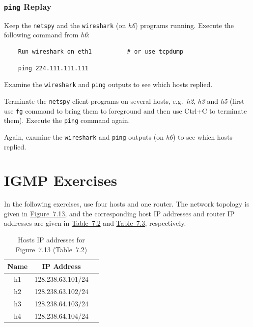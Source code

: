 \documentclass{UTNetLab}
\begin{document}
\section{\texttt{ping} Replay}
    Keep the \lstinline{netspy} and the \lstinline{wireshark} (on \textit{h6}) programs running.
    Execute the following command from \textit{h6}:

    \begin{lstlisting}
    Run wireshark on eth1          # or use tcpdump
    \end{lstlisting}

    \begin{lstlisting}
	ping 224.111.111.111
    \end{lstlisting}
    Examine the \lstinline{wireshark} and \lstinline{ping} outputs to see which hosts replied.

    Terminate the \lstinline{netspy} client programs on several hosts, e.g.\ \textit{h2}, \textit{h3} and \textit{h5} (first use \lstinline{fg} command to bring them to foreground and then use Ctrl+C to terminate them).
    Execute the \lstinline{ping} command again.

    Again, examine the \lstinline{wireshark} and \lstinline{ping} outputs (on \textit{h6}) to see which hosts replied.

\part{IGMP Exercises}\label{sec:igmp}
    In the following exercises, use four hosts and one router.
    The network topology is given in \hyperref[fig:7.13]{Figure~7.13}, and the corresponding host IP addresses and router IP addresses are given in \hyperref[tab:7.2]{Table~7.2} and \hyperref[tab:7.3]{Table~7.3}, respectively.

    \begin{table}[H]
        \caption{Hosts IP addresses for \hyperref[fig:7.13]{Figure~7.13} (Table~7.2)}
        \label{tab:7.2}
        \centering
        \begin{tabular}{ *3c }
            \hline \hline
            Name & IP Address \\
            \hline
                h1 & 128.238.63.101/24 \\
                h2 & 128.238.63.102/24 \\
                h3 & 128.238.64.103/24 \\
                h4 & 128.238.64.104/24 \\
            \hline \hline
            \end{tabular}
    \end{table}
\end{document}
